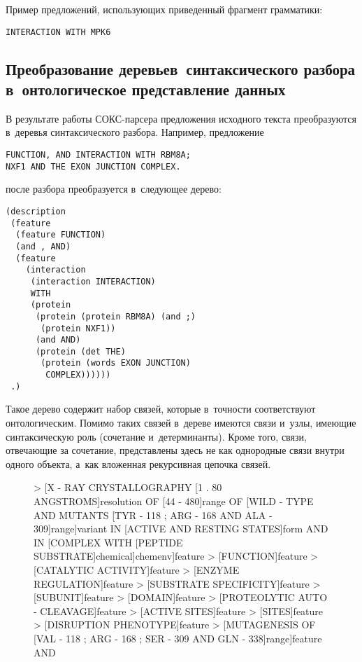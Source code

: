 \begin{multicols}{2}
  Пример предложений, использующих приведенный фрагмент грамматики:
  \begin{verbatim}
INTERACTION WITH MPK6
\end{verbatim}
  
  \subsection{Преобразование деревьев~синтаксического разбора 
в~онтологическое представление данных}
  
  В результате работы СОКС-пар\-се\-ра предложения исходного текста 
преобразуются в~деревья синтаксического разбора. Например, предложение
  \begin{verbatim}
FUNCTION, AND INTERACTION WITH RBM8A;
NXF1 AND THE EXON JUNCTION COMPLEX.
\end{verbatim}
после разбора преобразуется в~следующее дерево:
\begin{verbatim}
(description
 (feature
  (feature FUNCTION)
  (and , AND)
  (feature
    (interaction
     (interaction INTERACTION)
     WITH
     (protein
      (protein (protein RBM8A) (and ;)
       (protein NXF1))
      (and AND)
      (protein (det THE)
       (protein (words EXON JUNCTION)
        COMPLEX))))))
 .)
\end{verbatim}

  Такое дерево содержит набор связей, которые в~точности соответствуют 
онтологическим. Помимо таких связей в~дереве имеются связи и~узлы, 
имеющие синтаксическую роль (сочетание и~детерминанты). Кроме того, связи, 
отвечающие за сочетание, представлены здесь не как однородные связи внутри 
одного объекта, а~как вложенная рекурсивная цепочка связей.

  \begin{figure*}[b] %
  \vspace*{6pt}
\begin{center}

{\small
  \begin{boxedverbatim}
> [X - RAY CRYSTALLOGRAPHY [1 . 80 ANGSTROMS]resolution OF [44 - 480]range 
OF [WILD - TYPE AND MUTANTS [TYR - 118 ; ARG - 168 AND ALA - 309]range]variant
IN [ACTIVE AND RESTING STATES]form AND IN [COMPLEX WITH [PEPTIDE SUBSTRATE]chemical]chemenv]feature
> [FUNCTION]feature
> [CATALYTIC ACTIVITY]feature
> [ENZYME REGULATION]feature
> [SUBSTRATE SPECIFICITY]feature
> [SUBUNIT]feature
> [DOMAIN]feature
> [PROTEOLYTIC AUTO - CLEAVAGE]feature
> [ACTIVE SITES]feature
> [SITES]feature
> [DISRUPTION PHENOTYPE]feature
  > [MUTAGENESIS OF [VAL - 118 ; ARG - 168 ; SER - 309 AND GLN - 338]range]feature AND
  \end{boxedverbatim}
  
}
\end{center}
\end{figure*}
\end{multicols}
